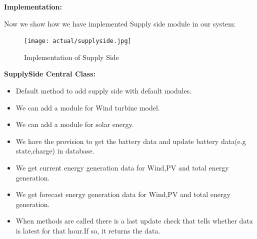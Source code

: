 \documentclass[runningheads]{llncs}
\begin{document}
\textbf{Implementation:}
\centerline {Now we show how we have implemented Supply side module in our system:}
\begin{figure}[H]
\centering
\texttt{[image: actual/supplyside.jpg]}
\caption{Implementation of Supply Side} 
\label{fig3}
\end{figure}
\medskip{}
{\raggedleft \textbf{SupplySide Central Class:}}
\begin{itemize}
    \item Default method to add supply side with  default modules.
    \item We can add a module for Wind turbine model.
    \item We can add a module for solar energy.
    \item We have the provision to get the battery data and update battery data(e.g  state,charge) in database.
    \item We get current energy generation data for Wind,PV and total energy generation.
    \item We get forecast energy generation data for Wind,PV and total energy generation.
    \item When methods are called there is  a last update check that tells whether data is latest for that hour.If so, it returns the data.
\end{itemize}
\end{document}

